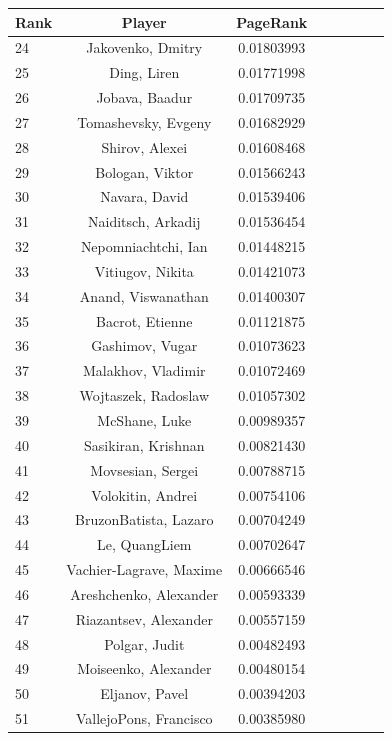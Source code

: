 \documentclass[pdftex,11pt,a4paper]{report}
\begin{document}
\begin{singlespace}
\begin{tabular}{l*{6}{c}r}
\small
Rank & Player & PageRank \\ 

\hline



24 & Jakovenko, Dmitry & 0.01803993 \\
25 & Ding, Liren & 0.01771998 \\
26 & Jobava, Baadur & 0.01709735 \\
27 & Tomashevsky, Evgeny & 0.01682929 \\
28 & Shirov, Alexei & 0.01608468 \\


29 & Bologan, Viktor & 0.01566243 \\
30 & Navara, David & 0.01539406 \\
31 & Naiditsch, Arkadij & 0.01536454 \\
32 & Nepomniachtchi, Ian & 0.01448215 \\
33 & Vitiugov, Nikita & 0.01421073 \\
34 & Anand, Viswanathan & 0.01400307 \\
35 & Bacrot, Etienne & 0.01121875 \\
36 & Gashimov, Vugar & 0.01073623 \\
37 & Malakhov, Vladimir & 0.01072469 \\
38 & Wojtaszek, Radoslaw & 0.01057302 \\
39 & McShane, Luke & 0.00989357 \\
40 & Sasikiran, Krishnan & 0.00821430 \\
41 & Movsesian, Sergei & 0.00788715 \\
42 & Volokitin, Andrei & 0.00754106 \\
43 & BruzonBatista, Lazaro & 0.00704249 \\
44 & Le, QuangLiem & 0.00702647 \\
45 & Vachier-Lagrave, Maxime & 0.00666546 \\
46 & Areshchenko, Alexander & 0.00593339 \\
47 & Riazantsev, Alexander & 0.00557159 \\
48 & Polgar, Judit & 0.00482493 \\
49 & Moiseenko, Alexander & 0.00480154 \\
50 & Eljanov, Pavel & 0.00394203 \\
51 & VallejoPons, Francisco & 0.00385980 \\

\end{tabular}
\end{singlespace}
\end{document}
